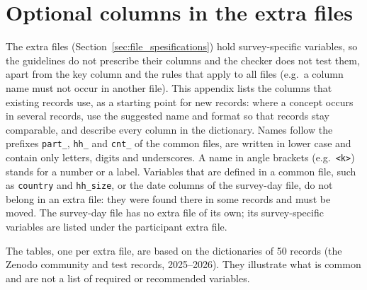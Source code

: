 \documentclass[11pt,a4paper]{article}
\begin{document}
\clearpage
\appendix
\section{Optional columns in the extra files}
\label{app:extra}

The extra files (Section~\ref{sec:file_spesifications}) hold survey-specific variables, so the guidelines do not prescribe their columns and the checker does not test them, apart from the key column and the rules that apply to all files (e.g.\ a column name must not occur in another file). This appendix lists the columns that existing records use, as a starting point for new records: where a concept occurs in several records, use the suggested name and format so that records stay comparable, and describe every column in the dictionary. Names follow the prefixes \texttt{part\_\allowbreak{}}, \texttt{hh\_\allowbreak{}} and \texttt{cnt\_\allowbreak{}} of the common files, are written in lower case and contain only letters, digits and underscores. A name in angle brackets (e.g.\ \texttt{<k>}) stands for a number or a label. Variables that are defined in a common file, such as \texttt{country} and \texttt{hh\_\allowbreak{}size}, or the date columns of the survey-day file, do not belong in an extra file: they were found there in some records and must be moved. The survey-day file has no extra file of its own; its survey-specific variables are listed under the participant extra file.

\noindent The tables, one per extra file, are based on the dictionaries of 50 records (the Zenodo community and test records, 2025--2026). They illustrate what is common and are not a list of required or recommended variables.
\end{document}
